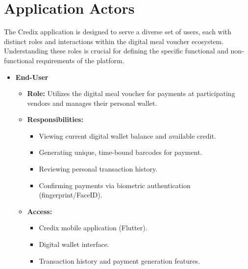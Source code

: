 \section{Application Actors}

The Credix application is designed to serve a diverse set of users, each with distinct roles and interactions within the digital meal voucher ecosystem. Understanding these roles is crucial for defining the specific functional and non-functional requirements of the platform.

\begin{itemize}
    \item \textbf{End-User}
    \begin{itemize}
        \item \textbf{Role:} Utilizes the digital meal voucher for payments at participating vendors and manages their personal wallet.
        \item \textbf{Responsibilities:}
        \begin{itemize}
            \item Viewing current digital wallet balance and available credit.
            \item Generating unique, time-bound barcodes for payment.
            \item Reviewing personal transaction history.
            \item Confirming payments via biometric authentication (fingerprint/FaceID).
        \end{itemize}
        \item \textbf{Access:}
        \begin{itemize}
            \item Credix mobile application (Flutter).
            \item Digital wallet interface.
            \item Transaction history and payment generation features.
        \end{itemize}
    \end{itemize}


\end{itemize}
